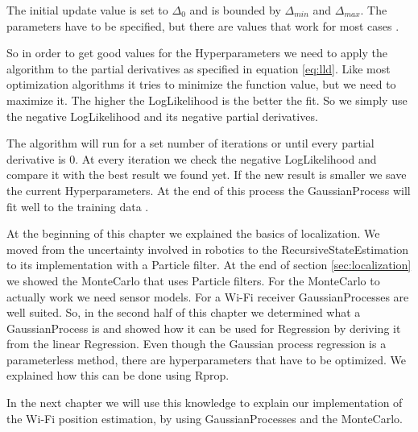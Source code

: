 The initial update value is set to $\Delta_0$ and is bounded by $\Delta_{min}$ and $\Delta_{max}$. The parameters have to be specified, but there are values that work for most cases \citep{blum2013optimization}. 

So in order to get good values for the \gls{Hyperparameter}s we need to apply the algorithm to the partial derivatives as specified in equation \ref{eq:lld}. Like most optimization algorithms it tries to minimize the function value, but we need to maximize it. The higher the \gls{LogLikelihood} is the better the fit. So we simply use the negative \gls{LogLikelihood} and its negative partial derivatives. 

The algorithm will run for a set number of iterations or until every partial derivative is 0. At every iteration we check the negative \gls{LogLikelihood} and compare it with the best result we found yet. If the new result is smaller we save the current \gls{Hyperparameter}s. At the end of this process the \Gls{GaussianProcess} will fit well to the training data \citep{blum2013optimization}.

At the beginning of this chapter we explained the basics of localization. We moved from the uncertainty involved in robotics to the \gls{RecursiveStateEstimation} to its implementation with a \gls{Particle} filter. At the end of section \ref{sec:localization} we showed the \Gls{MonteCarlo} that uses \gls{Particle} filters. For the \Gls{MonteCarlo} to actually work we need sensor models. For a Wi-Fi receiver \Gls{GaussianProcess}es are well suited. 
So, in the second half of this chapter we determined what a \Gls{GaussianProcess} is and showed how it can be used for \gls{Regression} by deriving it from the linear \gls{Regression}. Even though the Gaussian process regression is a parameterless method, there are hyperparameters that have to be optimized. We explained how this can be done using \Gls{Rprop}. 

In the next chapter we will use this knowledge to explain our implementation of the Wi-Fi position estimation, by using \Gls{GaussianProcess}es and the \Gls{MonteCarlo}. 
